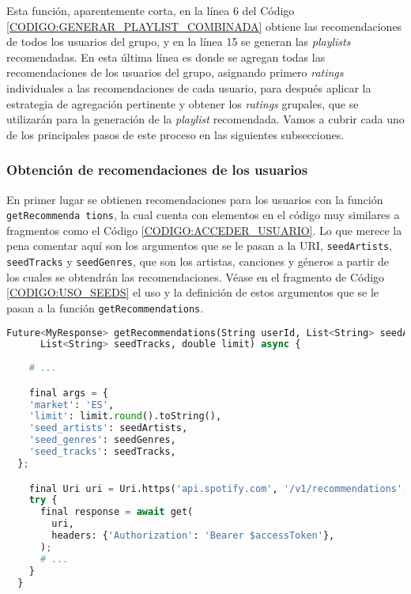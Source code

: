 Esta función, aparentemente corta, en la línea 6 del Código \ref{CODIGO:GENERAR_PLAYLIST_COMBINADA} obtiene las recomendaciones de todos los usuarios del grupo, y en la línea 15 se 
generan las \textit{playlists} recomendadas. En esta última línea es donde se agregan todas las recomendaciones de los usuarios del grupo, 
asignando primero \textit{ratings} individuales a las recomendaciones de cada usuario, para después aplicar la estrategia de agregación pertinente y obtener
los \textit{ratings} grupales, que se utilizarán para la generación de la \textit{playlist} recomendada. Vamos a cubrir cada uno de los principales
pasos de este proceso en las siguientes subsecciones.


\subsubsection{Obtención de recomendaciones de los usuarios\label{subsec:obtencion_recomendaciones_implementacion}}

En primer lugar se obtienen recomendaciones para los usuarios con la función \texttt{getRecommenda tions}, la cual cuenta con 
elementos en el código muy similares a fragmentos como el Código \ref{CODIGO:ACCEDER_USUARIO}. Lo que merece la pena comentar aquí 
son los argumentos que se le pasan a la URI, \texttt{seedArtists}, \texttt{seedTracks} y \texttt{seedGenres}, que son los artistas, canciones y 
géneros a partir de los cuales se obtendrán las recomendaciones. Véase en el fragmento de Código \ref{CODIGO:USO_SEEDS} el uso y la definición de estos 
argumentos que se le pasan a la función \texttt{getRecommendations}.

\begin{lstlisting}[language=python, caption=Definición de los argumentos \texttt{seedArtists} y \texttt{seedTracks}, label=CODIGO:USO_SEEDS]
  Future<MyResponse> getRecommendations(String userId, List<String> seedArtists,
      List<String> seedTracks, double limit) async {
    
    # ...

    final args = {
    'market': 'ES',
    'limit': limit.round().toString(),
    'seed_artists': seedArtists,
    'seed_genres': seedGenres,
    'seed_tracks': seedTracks,
  };

    final Uri uri = Uri.https('api.spotify.com', '/v1/recommendations', args);
    try {
      final response = await get(
        uri,
        headers: {'Authorization': 'Bearer $accessToken'},
      );
      # ...
    }
  }
\end{lstlisting}

